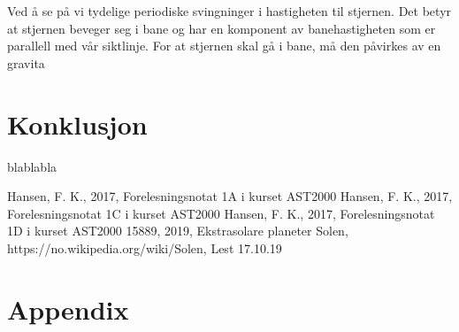 \documentclass[reprint, english,notitlepage]{revtex4-1}  %
\begin{document}
Ved å se på  vi tydelige periodiske svingninger i hastigheten til
 stjernen. Det betyr at stjernen beveger seg i bane og har en komponent av banehastigheten som er
 parallell med vår siktlinje. For at stjernen skal gå i bane, må den påvirkes av en
 gravita


\section{Konklusjon}
blablabla



\onecolumngrid
\vspace{1cm} %


\begin{thebibliography}{}
 Hansen, F. K.,  2017, Forelesningsnotat 1A i kurset AST2000
 Hansen, F. K.,  2017, Forelesningsnotat 1C i kurset AST2000
 Hansen, F. K.,  2017, Forelesningsnotat 1D i kurset AST2000
 15889,  2019, Ekstrasolare planeter
 Solen, https://no.wikipedia.org/wiki/Solen, Lest 17.10.19

\end{thebibliography}



\section{Appendix}
\end{document}
